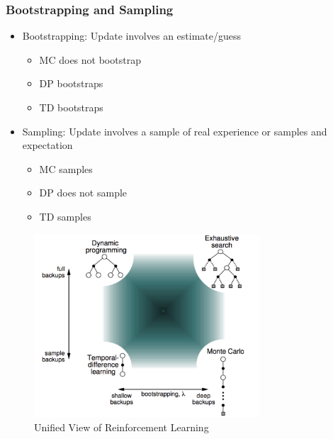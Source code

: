 \subsubsection*{Bootstrapping and Sampling}
\begin{itemize}
    \item Bootstrapping: Update involves an estimate/guess
    \begin{itemize}
        \item MC does not bootstrap
        \item DP bootstraps
        \item TD bootstraps
    \end{itemize}
    \item Sampling: Update involves a sample of real experience or samples and expectation
    \begin{itemize}
        \item MC samples
        \item DP does not sample
        \item TD samples
    \end{itemize}
\end{itemize}

\begin{figure}[H]
    \centering
    \includegraphics[width=0.75\textwidth]{figures/uni-rl.png}
    \caption{Unified View of Reinforcement Learning}
    \label{fig:uni-rl}
\end{figure}
























